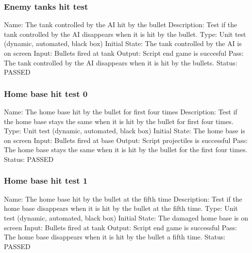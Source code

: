 \documentclass{article}
\begin{document}
\subsubsection{Enemy tanks hit test}
\label{sec:3.1.22}
Name:  The tank controlled by the AI hit by the bullet\newline
Description: Test if the tank controlled by the AI disappears when it is hit 
by the bullet. \newline
Type: Unit test (dynamic, automated, black box) \newline
Initial State:  The tank controlled by the AI is on screen \newline
Input: Bullets fired at tank\newline
Output: Script end game is succesful\newline
Pass: The tank controlled by the AI disappears when it is hit by the bullets.
\newline
\newline Status: PASSED


\subsubsection{Home base hit test 0}
\label{sec:3.1.23}
Name:  The home base hit by the bullet for first four times\newline
Description: Test if the home base stays the same when it is hit by the bullet 
for first four times. \newline
Type: Unit test (dynamic, automated, black box) \newline
Initial State:  The home base is on screen \newline
Input: Bullets fired at base\newline
Output: Script projectiles is successful  \newline
Pass:  The home base stays the same when it is hit by the bullet for the first 
four times. \newline
\newline Status: PASSED


\subsubsection{Home base hit test 1}
\label{sec:3.1.24}
Name: The home base hit by the bullet at the fifth time\newline
Description: Test if the home base disappears when it is hit by the bullet  at 
the fifth time. \newline
Type: Unit test (dynamic, automated, black box) \newline
Initial State:  The damaged home base is on screen \newline
Input: Bullets fired at tank\newline
Output: Script end game is successful\newline
Pass: The home base disappears when it is hit by the bullet a fifth 
time. \newline
\newline Status: PASSED
\end{document}
